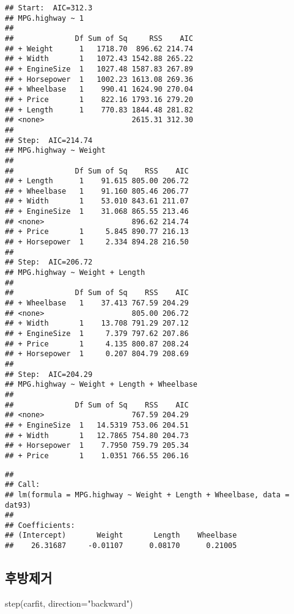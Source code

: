 \documentclass[
]{book}
\newenvironment{Shaded}{\begin{snugshade}}{\end{snugshade}}
\newcommand{\AttributeTok}[1]{\textcolor[rgb]{0.77,0.63,0.00}{#1}}
\newcommand{\FunctionTok}[1]{\textcolor[rgb]{0.00,0.00,0.00}{#1}}
\newcommand{\NormalTok}[1]{#1}
\newcommand{\StringTok}[1]{\textcolor[rgb]{0.31,0.60,0.02}{#1}}
\begin{document}
\begin{verbatim}
## Start:  AIC=312.3
## MPG.highway ~ 1
## 
##              Df Sum of Sq     RSS    AIC
## + Weight      1   1718.70  896.62 214.74
## + Width       1   1072.43 1542.88 265.22
## + EngineSize  1   1027.48 1587.83 267.89
## + Horsepower  1   1002.23 1613.08 269.36
## + Wheelbase   1    990.41 1624.90 270.04
## + Price       1    822.16 1793.16 279.20
## + Length      1    770.83 1844.48 281.82
## <none>                    2615.31 312.30
## 
## Step:  AIC=214.74
## MPG.highway ~ Weight
## 
##              Df Sum of Sq    RSS    AIC
## + Length      1    91.615 805.00 206.72
## + Wheelbase   1    91.160 805.46 206.77
## + Width       1    53.010 843.61 211.07
## + EngineSize  1    31.068 865.55 213.46
## <none>                    896.62 214.74
## + Price       1     5.845 890.77 216.13
## + Horsepower  1     2.334 894.28 216.50
## 
## Step:  AIC=206.72
## MPG.highway ~ Weight + Length
## 
##              Df Sum of Sq    RSS    AIC
## + Wheelbase   1    37.413 767.59 204.29
## <none>                    805.00 206.72
## + Width       1    13.708 791.29 207.12
## + EngineSize  1     7.379 797.62 207.86
## + Price       1     4.135 800.87 208.24
## + Horsepower  1     0.207 804.79 208.69
## 
## Step:  AIC=204.29
## MPG.highway ~ Weight + Length + Wheelbase
## 
##              Df Sum of Sq    RSS    AIC
## <none>                    767.59 204.29
## + EngineSize  1   14.5319 753.06 204.51
## + Width       1   12.7865 754.80 204.73
## + Horsepower  1    7.7950 759.79 205.34
## + Price       1    1.0351 766.55 206.16
\end{verbatim}

\begin{verbatim}
## 
## Call:
## lm(formula = MPG.highway ~ Weight + Length + Wheelbase, data = dat93)
## 
## Coefficients:
## (Intercept)       Weight       Length    Wheelbase  
##    26.31687     -0.01107      0.08170      0.21005
\end{verbatim}

\hypertarget{uxd6c4uxbc29uxc81cuxac70-1}{%
\subsection{후방제거}\label{uxd6c4uxbc29uxc81cuxac70-1}}

\begin{Shaded}
\begin{Highlighting}[]
\FunctionTok{step}\NormalTok{(carfit, }\AttributeTok{direction=}\StringTok{"backward"}\NormalTok{)}
\end{Highlighting}
\end{Shaded}
\end{document}
